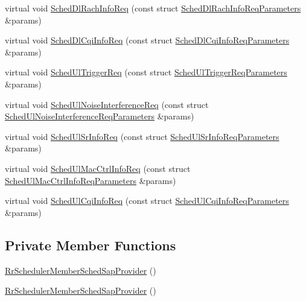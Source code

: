 \begin{DoxyCompactItemize}
\item 
virtual void \hyperlink{classns3_1_1RrSchedulerMemberSchedSapProvider_a15b2b0604e7546ba0422088a1d07a175}{Sched\+Dl\+Rach\+Info\+Req} (const struct \hyperlink{structns3_1_1FfMacSchedSapProvider_1_1SchedDlRachInfoReqParameters}{Sched\+Dl\+Rach\+Info\+Req\+Parameters} \&params)
\item 
virtual void \hyperlink{classns3_1_1RrSchedulerMemberSchedSapProvider_a9807e83afe3f48cf42a4862a260a7391}{Sched\+Dl\+Cqi\+Info\+Req} (const struct \hyperlink{structns3_1_1FfMacSchedSapProvider_1_1SchedDlCqiInfoReqParameters}{Sched\+Dl\+Cqi\+Info\+Req\+Parameters} \&params)
\item 
virtual void \hyperlink{classns3_1_1RrSchedulerMemberSchedSapProvider_a99b9b13afcd1d359182511e037054632}{Sched\+Ul\+Trigger\+Req} (const struct \hyperlink{structns3_1_1FfMacSchedSapProvider_1_1SchedUlTriggerReqParameters}{Sched\+Ul\+Trigger\+Req\+Parameters} \&params)
\item 
virtual void \hyperlink{classns3_1_1RrSchedulerMemberSchedSapProvider_a2bf5ba2ec771792bd11fa5a6a0a71686}{Sched\+Ul\+Noise\+Interference\+Req} (const struct \hyperlink{structns3_1_1FfMacSchedSapProvider_1_1SchedUlNoiseInterferenceReqParameters}{Sched\+Ul\+Noise\+Interference\+Req\+Parameters} \&params)
\item 
virtual void \hyperlink{classns3_1_1RrSchedulerMemberSchedSapProvider_a7de2ba79b0455e77aac8c55c8b6df8ac}{Sched\+Ul\+Sr\+Info\+Req} (const struct \hyperlink{structns3_1_1FfMacSchedSapProvider_1_1SchedUlSrInfoReqParameters}{Sched\+Ul\+Sr\+Info\+Req\+Parameters} \&params)
\item 
virtual void \hyperlink{classns3_1_1RrSchedulerMemberSchedSapProvider_a8e6cba0a08491274141e1ea391d68fb2}{Sched\+Ul\+Mac\+Ctrl\+Info\+Req} (const struct \hyperlink{structns3_1_1FfMacSchedSapProvider_1_1SchedUlMacCtrlInfoReqParameters}{Sched\+Ul\+Mac\+Ctrl\+Info\+Req\+Parameters} \&params)
\item 
virtual void \hyperlink{classns3_1_1RrSchedulerMemberSchedSapProvider_a5bfb4a90acacc4afd6b8a322c88e173e}{Sched\+Ul\+Cqi\+Info\+Req} (const struct \hyperlink{structns3_1_1FfMacSchedSapProvider_1_1SchedUlCqiInfoReqParameters}{Sched\+Ul\+Cqi\+Info\+Req\+Parameters} \&params)
\end{DoxyCompactItemize}
\subsection*{Private Member Functions}
\begin{DoxyCompactItemize}
\item 
\hyperlink{classns3_1_1RrSchedulerMemberSchedSapProvider_a4c7184a4d178f0dfe362eb582d51479f}{Rr\+Scheduler\+Member\+Sched\+Sap\+Provider} ()
\item 
\hyperlink{classns3_1_1RrSchedulerMemberSchedSapProvider_a4c7184a4d178f0dfe362eb582d51479f}{Rr\+Scheduler\+Member\+Sched\+Sap\+Provider} ()
\end{DoxyCompactItemize}
